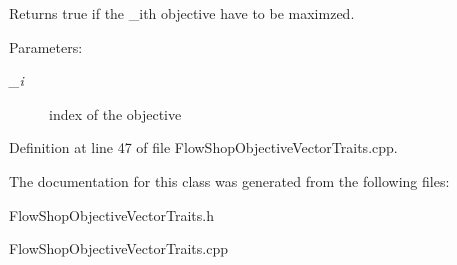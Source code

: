 Returns true if the \_\-ith objective have to be maximzed. 

\begin{Desc}
\item[Parameters:]
\begin{description}
\item[{\em \_\-i}]index of the objective \end{description}
\end{Desc}


Definition at line 47 of file Flow\-Shop\-Objective\-Vector\-Traits.cpp.

The documentation for this class was generated from the following files:\begin{CompactItemize}
\item 
Flow\-Shop\-Objective\-Vector\-Traits.h\item 
Flow\-Shop\-Objective\-Vector\-Traits.cpp\end{CompactItemize}
